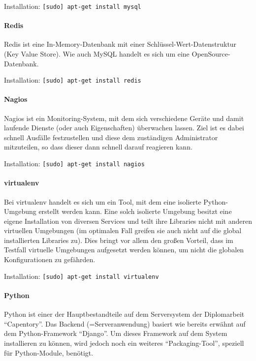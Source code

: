 Installation: \texttt{{[}sudo{]}\ apt-get\ install\ mysql}

\hypertarget{redis}{%
\paragraph{Redis}\label{redis}}

Redis ist eine In-Memory-Datenbank mit einer
Schlüssel-Wert-Datenstruktur (Key Value Store). Wie auch MySQL handelt
es sich um eine OpenSource-Datenbank.

Installation: \texttt{{[}sudo{]}\ apt-get\ install\ redis}

\hypertarget{nagios}{%
\paragraph{Nagios}\label{nagios}}

Nagios ist ein Monitoring-System, mit dem sich verschiedene Geräte und
damit laufende Dienste (oder auch Eigenschaften) überwachen lassen. Ziel
ist es dabei schnell Ausfälle festzustellen und diese dem zuständigen
Administrator mitzuteilen, so dass dieser dann schnell darauf reagieren
kann.

Installation: \texttt{{[}sudo{]}\ apt-get\ install\ nagios}

\hypertarget{virtualenv}{%
\paragraph{virtualenv}\label{virtualenv}}

Bei virtualenv handelt es sich um ein Tool, mit dem eine isolierte
Python-Umgebung erstellt werden kann. Eine solch isolierte Umgebung
besitzt eine eigene Installation von diversen Services und teilt ihre
Libraries nicht mit anderen virtuellen Umgebungen (im optimalen Fall
greifen sie auch nicht auf die global installierten Libraries zu). Dies
bringt vor allem den großen Vorteil, dass im Testfall virtuelle
Umgebungen aufgesetzt werden können, um nicht die globalen
Konfigurationen zu gefährden.

Installation: \texttt{{[}sudo{]}\ apt-get\ install\ virtualenv}

\hypertarget{python}{%
\paragraph{Python}\label{python}}

Python ist einer der Hauptbestandteile auf dem Serversystem der
Diplomarbeit ``Capentory''. Das Backend (=Serveranwendung) basiert wie
bereits erwähnt auf dem Python-Framework ``Django''. Um dieses Framework
auf dem System installieren zu können, wird jedoch noch ein weiteres
``Packaging-Tool'', speziell für Python-Module, benötigt.

